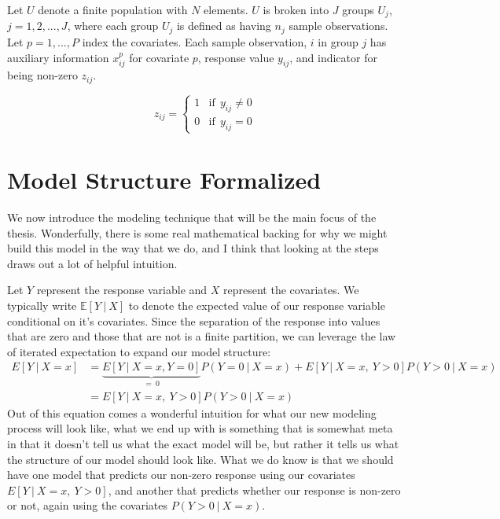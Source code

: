 \documentclass[12pt,twoside]{reedthesis}
\begin{document}
Let \(U\) denote a finite population with \(N\) elements. \(U\) is broken into \(J\) groups \(U_j\), \(j = 1, 2, ..., J\), where each group \(U_j\) is defined as having \(n_j\) sample observations. Let \(p = 1, ..., P\) index the covariates. Each sample observation, \(i\) in group \(j\) has auxiliary information \(x_{ij}^p\) for covariate \(p\), response value \(y_{ij}\), and indicator for being non-zero \(z_{ij}\).

\[
z_{ij} =
\begin{cases}
1 & \text{if}\ \ y_{ij} \ne 0 \\
0 & \text{if} \ \ y_{ij} = 0
\end{cases}
\]

\hypertarget{model-structure-formalized}{%
\section{Model Structure Formalized}\label{model-structure-formalized}}

We now introduce the modeling technique that will be the main focus of the thesis. Wonderfully, there is some real mathematical backing for why we might build this model in the way that we do, and I think that looking at the steps draws out a lot of helpful intuition.

Let \(Y\) represent the response variable and \(X\) represent the covariates. We typically write \(\mathbb{E}[Y \ | \ X]\) to denote the expected value of our response variable conditional on it's covariates. Since the separation of the response into values that are zero and those that are not is a finite partition, we can leverage the law of iterated expectation to expand our model structure:
\begin{equation}
\begin{split}
    E[ Y  \ | \ X = x] &= \underbrace{E[Y \ | \ X = x, Y = 0]}_{= \ 0}P(Y = 0 \ | \ X = x) + E[Y \ | \ X = x, \ Y > 0]P(Y> 0 \ | \ X = x) \\
    &= E[Y \ | \ X = x, \ Y > 0]P(Y > 0 \ | \ X = x) 
\end{split}
\label{eq:intuition}
\end{equation}
Out of this equation comes a wonderful intuition for what our new modeling process will look like, what we end up with is something that is somewhat meta in that it doesn't tell us what the exact model will be, but rather it tells us what the structure of our model should look like. What we do know is that we should have one model that predicts our non-zero response using our covariates \(E[Y \ | \ X = x, \ Y>0]\), and another that predicts whether our response is non-zero or not, again using the covariates \(P(Y > 0 \ | \ X = x)\).
\end{document}
